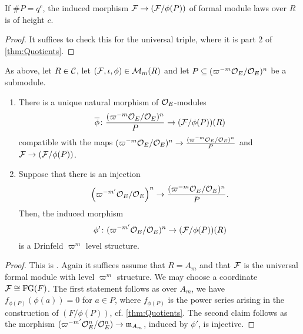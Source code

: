 \documentclass[../main.tex]{subfiles}
\begin{document}
\begin{lem}\label{lem:PropertyOfQuotient}
  If $\# P = q^c$, the induced morphism $\mathcal{F} \to (\mathcal{F}/\phi(P))$ of formal
  module laws over $R$ is of height $c$.
\begin{proof}
  It suffices to check this for the universal triple, where it is part 2 of 
  \cref{thm:Quotients}.
\end{proof}
\end{lem}

\begin{lem}\label{lem:DrinfeldLevelOnQuotients}
  As above, let $R \in \mathcal{C}$, let $(\mathcal{F}, \iota, \phi) \in \mathcal{M}_m(R)$ and let 
  $P \subseteq (\varpi^{-m}\mathcal{O}_E/\mathcal{O}_E)^n$ be a submodule.   
  \begin{enumerate}
    \item There is a unique natural morphism of $\mathcal{O}_E$-modules
      \begin{equation*}
        \overline \phi \colon \frac{(\varpi^{-m} \mathcal{O}_E/\mathcal{O}_E)^n}{P} \to (\mathcal{F}/\phi(P))(R)
      \end{equation*}
      compatible with the maps $(\varpi^{-m}\mathcal{O}_E/\mathcal{O}_E)^n \to
      \frac{(\varpi^{-m} \mathcal{O}_E/\mathcal{O}_E)^n}{P}$ and $\mathcal{F} \to (\mathcal{F}/\phi(P))$. 
    \item Suppose that  there is an injection 
  \begin{equation*}
    \left(\varpi^{-m'} \mathcal{O}_E/\mathcal{O}_E \right)^n \to \frac{(\varpi^{-m}
    \mathcal{O}_E/\mathcal{O}_E)^n}{P}.
  \end{equation*}
  Then, the induced morphism 
  \begin{equation*}
  \phi'\colon ({\varpi^{-m'} \mathcal{O}_E}/{\mathcal{O}_E})^n  \to 
  (\mathcal{F}/\phi(P))(R)
  \end{equation*}
  is a Drinfeld $\varpi^m$ level structure.
  \end{enumerate}
\end{lem}
\begin{proof}
  This is \cite[Proposition 4.4]{drinfel1974elliptic}. Again it suffices assume 
  that $R = A_m$ and that $\mathcal{F}$ is the universal formal module with level
  $\varpi^m$ structure. We may choose a coordinate $\mathcal{F} \cong \textnormal{FG}(F)$. The first
  statement follows as over $A_m$, we have $f_{\phi(P)}(\phi(a)) = 0$ for $a
  \in P$, where $f_{\phi(P)}$ is the power series arising in the construction of 
  $(F/\phi(P))$, cf. \cref{thm:Quotients}. The second claim follows as the 
  morphism $(\varpi^{-m'} \mathcal{O}_E^n/\mathcal{O}_E^n) \to \mathfrak{m}_{A_m}$, induced by 
  $\phi'$, is injective.
\end{proof}
\end{document}
